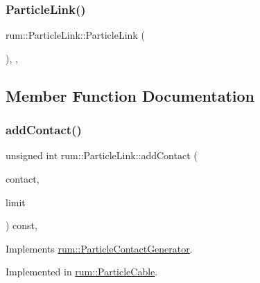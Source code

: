 \subsubsection{\texorpdfstring{Particle\+Link()}{ParticleLink()}}
{\footnotesize\ttfamily rum\+::\+Particle\+Link\+::\+Particle\+Link (\begin{DoxyParamCaption}{ }\end{DoxyParamCaption})\hspace{0.3cm}{\ttfamily [explicit]}, {\ttfamily [protected]}, {\ttfamily [default]}}



\subsection{Member Function Documentation}
\mbox{\label{classrum_1_1_particle_link_a0da76619bd1d2ae04d5f8173c2883ff2}} 
\subsubsection{\texorpdfstring{add\+Contact()}{addContact()}}
{\footnotesize\ttfamily unsigned int rum\+::\+Particle\+Link\+::add\+Contact (\begin{DoxyParamCaption}\item[{\mbox{\hyperlink{classrum_1_1_particle_contact}{Particle\+Contact}} $\ast$}]{contact,  }\item[{unsigned int}]{limit }\end{DoxyParamCaption}) const\hspace{0.3cm}{\ttfamily [override]}, {}}



Implements \mbox{\hyperlink{classrum_1_1_particle_contact_generator_a343d3df815d7e170458fe937fe82aad5}{rum\+::\+Particle\+Contact\+Generator}}.



Implemented in \mbox{\hyperlink{classrum_1_1_particle_cable_a078344be0db7ccc00d326ac767736431}{rum\+::\+Particle\+Cable}}.

\mbox{\label{classrum_1_1_particle_link_ad77a03be98566b0913aad0882e2283ac}} 
